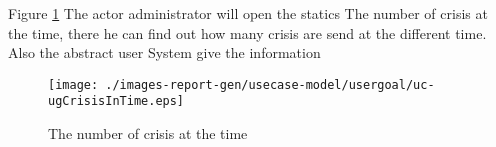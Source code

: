 \begin{usecase}

\end{usecase} 


Figure \ref{fig:lu.uni.lassy.excalibur.examples.icrash-RE-UCD-uc-ugCrisisInTime}
The actor administrator will open the statics The number of crisis at the time, there he can find out how many crisis are send at the different time. Also the abstract user System give the information 

\begin{figure}[htbp]
\begin{center}

\texttt{[image: ./images-report-gen/usecase-model/usergoal/uc-ugCrisisInTime.eps]}
\end{center}
\caption[lu.uni.lassy.excalibur.examples.icrash Use Case Diagram: uc-ugCrisisInTime]{The number of crisis at the time}
\label{fig:lu.uni.lassy.excalibur.examples.icrash-RE-UCD-uc-ugCrisisInTime}
\end{figure}
\vspace{0.5cm}
